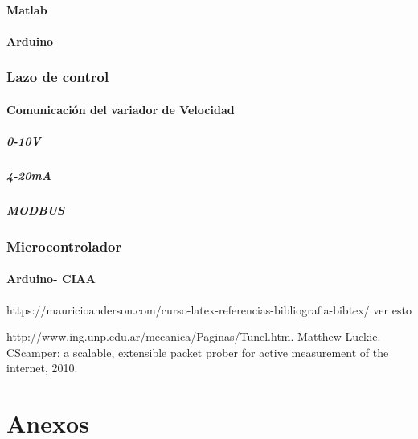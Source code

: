 \documentclass[12pt,a4paper]{article}
\begin{document}
	\subsection{Matlab}
	\subsection{Arduino}
	\section{Lazo de control}
	\subsection{Comunicación del variador de Velocidad}
	\subsubsection{0-10V}
	\subsubsection{4-20mA}
	\subsubsection{MODBUS}
	\section{Microcontrolador}
	\subsection{Arduino- CIAA}

\newpage

https://mauricioanderson.com/curso-latex-referencias-bibliografia-bibtex/ ver esto
\begin{thebibliography}{0}
	 http://www.ing.unp.edu.ar/mecanica/Paginas/Tunel.htm.
	 Matthew Luckie. CScamper: a scalable, extensible packet 
	prober for active measurement of the internet, 2010.
\end{thebibliography}
\newpage
\part{Anexos}
\end{document}
